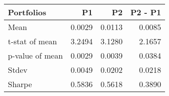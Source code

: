 \begin{tabular}{lrrr}
\toprule
Portfolios & P1 & P2 & P2 - P1 \\
\midrule
Mean & 0.0029 & 0.0113 & 0.0085 \\
t-stat of mean & 3.2494 & 3.1280 & 2.1657 \\
p-value of mean & 0.0029 & 0.0039 & 0.0384 \\
Stdev & 0.0049 & 0.0202 & 0.0218 \\
Sharpe & 0.5836 & 0.5618 & 0.3890 \\
\bottomrule
\end{tabular}
